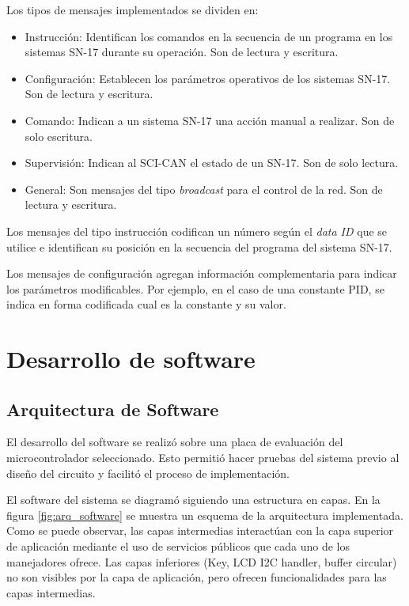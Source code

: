 Los tipos de mensajes implementados se dividen en:
\begin{itemize}
	\item Instrucción: Identifican los comandos en la secuencia de un programa en los sistemas SN-17 durante su operación. Son de lectura y escritura.
	\item Configuración: Establecen los parámetros operativos de los sistemas SN-17. Son de lectura y escritura.
	\item Comando: Indican a un sistema SN-17 una acción manual a realizar. Son de solo escritura.
	\item Supervisión: Indican al SCI-CAN el estado de un SN-17. Son de solo lectura.
	\item General: Son mensajes del tipo \textit{broadcast} para el control de la red. Son de lectura y escritura.
\end{itemize}

Los mensajes del tipo instrucción codifican un número según el \textit{data ID} que se utilice e identifican su posición en la secuencia del programa del sistema SN-17.

Los mensajes de configuración agregan información complementaria para indicar los parámetros modificables. Por ejemplo, en el caso de una constante PID, se indica en forma codificada cual es la constante y su valor. 

\section{Desarrollo de software}
\label{desarrollo_software}

\subsection{Arquitectura de Software}

El desarrollo del software se realizó sobre una placa de evaluación del microcontrolador seleccionado\citep{web_dev_board}. Esto permitió hacer pruebas del sistema previo al diseño del circuito y facilitó el proceso de implementación.

El software del sistema se diagramó siguiendo una estructura en capas. En la figura \ref{fig:arq_software} se muestra un esquema de la arquitectura implementada. Como se puede observar, las capas intermedias interactúan con la capa superior de aplicación mediante el uso de servicios públicos que cada uno de los manejadores ofrece. Las capas inferiores (Key, LCD I2C handler, buffer circular) no son visibles por la capa de aplicación, pero ofrecen funcionalidades para las capas intermedias. 


